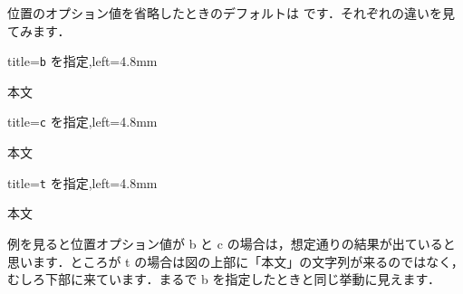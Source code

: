 \documentclass[../geometrymemo.tex]{subfiles}
\begin{document}
位置のオプション値を省略したときのデフォルトは  です．それぞれの違いを見てみます．
\begin{tcblisting}{title=\texttt{b} を指定,left=4.8mm}
    \begin{minipage}[b]{0.3\columnwidth}
        \centering
    \end{minipage}
    本文
    \begin{minipage}[b]{0.3\columnwidth}
        \centering
    \end{minipage}
\end{tcblisting}

\begin{tcblisting}{title=\texttt{c} を指定,left=4.8mm}
    \begin{minipage}[c]{0.3\columnwidth}
        \centering
    \end{minipage}
    本文
    \begin{minipage}[c]{0.3\columnwidth}
        \centering
    \end{minipage}
\end{tcblisting}

\begin{tcblisting}{title=\texttt{t} を指定,left=4.8mm}
    \begin{minipage}[t]{0.3\columnwidth}
        \centering
    \end{minipage}
    本文
    \begin{minipage}[t]{0.3\columnwidth}
        \centering
    \end{minipage}
\end{tcblisting}
例を見ると位置オプション値が b と c の場合は，想定通りの結果が出ていると思います．ところが t の場合は図の上部に「本文」の文字列が来るのではなく，むしろ下部に来ています．まるで b を指定したときと同じ挙動に見えます．
\end{document}
